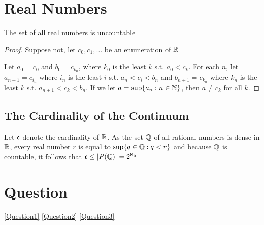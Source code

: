 \documentclass[11pt]{article}
\begin{document}
\section{Real Numbers}
\label{sec:orgbfc862a}
\begin{theorem}[Cantor]
The set of all real numbers is uncountable
\end{theorem}

\begin{proof}
Suppose not, let \(c_0,c_1,\dots\) be an enumeration of \(\mathbb{R}\)

Let \(a_0=c_0\) and \(b_0=c_{k_0}\), where \(k_0\) is the least \(k\) s.t. \(a_0<c_k\). For
each \(n\), let \(a_{n+1}=c_{i_n}\) where \(i_n\) is the least \(i\) s.t. \(a_n<c_i<b_n\)
and \(b_{n+1}=c_{k_n}\) where \(k_n\) is the least \(k\) s.t. \(a_{n+1}<c_k<b_n\). If we
let \(a=\sup\{a_n:n\in\mathbb{N}\}\), then \(a\neq c_k\) for all \(k\).
\end{proof}

\subsection{The Cardinality of the Continuum}
\label{sec:org68480f2}
Let \(\mathfrak{c}\) denote the cardinality of \(\mathbb{R}\). As the set \(\mathbb{Q}\) of all rational numbers is dense
in \(\mathbb{R}\), every real number \(r\) is equal to \(\sup\{q\in\mathbb{Q}:q<r\}\) and because \(\mathbb{Q}\) is countable,
it follows that \(\fc\le\abs{P(\Q)}=2^{\aleph_0}\)

\section{Question}
\label{sec:org5353d19}
\ref{Question1}
\ref{Question2}
\ref{Question3}
\end{document}
